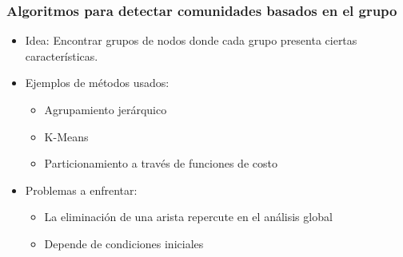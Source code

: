 \documentclass[
10pt, %
aspectratio=169, %
]{beamer}
\begin{document}
	\begin{frame}
		
		\frametitle{Algoritmos para detectar comunidades basados en el grupo}
		
		\begin{itemize}
			\item Idea: Encontrar grupos de nodos donde cada grupo presenta ciertas características. \\[2mm]
			
			\item Ejemplos de métodos usados:
			\begin{itemize}
				\item Agrupamiento jerárquico
				\item K-Means
				\item Particionamiento a través de funciones de costo \\[2mm]
			\end{itemize}
		
			\item Problemas a enfrentar:
			\begin{itemize}
				\item La eliminación de una arista repercute en el análisis global
				\item Depende de condiciones iniciales \\[2mm]
			\end{itemize}
			
		\end{itemize}
			
	\end{frame}
	
\end{document}
